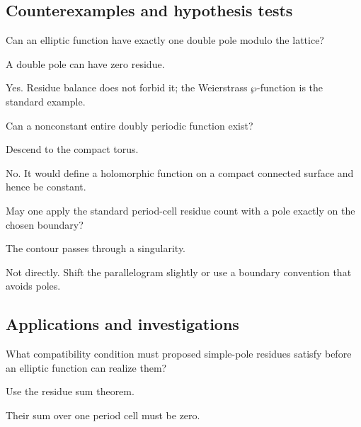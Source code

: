 \subsection*{Counterexamples and hypothesis tests}

\begin{exercise}\label{exr:iv28-expand-10}
Can an elliptic function have exactly one double pole modulo the lattice?
\end{exercise}
\begin{hint}
A double pole can have zero residue.
\end{hint}
\begin{solution}
Yes. Residue balance does not forbid it; the Weierstrass \(\wp\)-function is the standard example.
\end{solution}

\begin{exercise}\label{exr:iv28-expand-11}
Can a nonconstant entire doubly periodic function exist?
\end{exercise}
\begin{hint}
Descend to the compact torus.
\end{hint}
\begin{solution}
No. It would define a holomorphic function on a compact connected surface and hence be constant.
\end{solution}

\begin{exercise}\label{exr:iv28-expand-12}
May one apply the standard period-cell residue count with a pole exactly on the chosen boundary?
\end{exercise}
\begin{hint}
The contour passes through a singularity.
\end{hint}
\begin{solution}
Not directly. Shift the parallelogram slightly or use a boundary convention that avoids poles.
\end{solution}

\subsection*{Applications and investigations}

\begin{exercise}\label{exr:iv28-expand-13}
What compatibility condition must proposed simple-pole residues satisfy before an elliptic function can realize them?
\end{exercise}
\begin{hint}
Use the residue sum theorem.
\end{hint}
\begin{solution}
Their sum over one period cell must be zero.
\end{solution}

